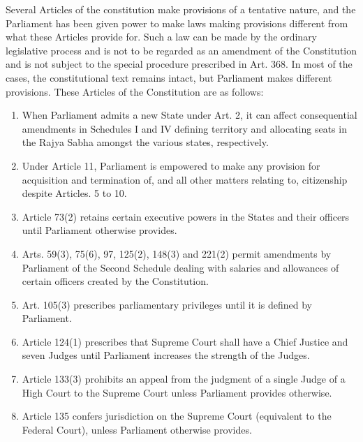 \begin{multicols}{2}
\noi
Several Articles of the constitution make provisions of a tentative nature, and the Parliament has
been given power to make laws making provisions different from what these Articles provide for.
Such a law can be made by the ordinary legislative process and is not to be regarded as an
amendment of the Constitution and is not subject to the special procedure prescribed in Art. 368.
In most of the cases, the constitutional text remains intact, but Parliament makes different
provisions. These Articles of the Constitution are as follows:

\begin{enumerate}

\item[(1)] When Parliament admits a new State under Art. 2, it can affect consequential amendments in
Schedules I and IV defining territory and allocating seats in the Rajya Sabha amongst the various
states, respectively.

\item[(2)] Under Article 11, Parliament is empowered to make any provision for acquisition and termination of, and all other matters relating to, citizenship despite Articles. 5 to 10.

\item[(3)] Article 73(2) retains certain executive powers in the States and their officers until Parliament
otherwise provides.

\item[(4)] Arts. 59(3), 75(6), 97, 125(2), 148(3) and 221(2) permit amendments by Parliament of the
Second Schedule dealing with salaries and allowances of certain officers created by the
Constitution.

\item[(5)] Art. 105(3) prescribes parliamentary privileges until it is defined by Parliament.

\item[(6)] Article 124(1) prescribes that Supreme Court shall have a Chief Justice and seven Judges until
Parliament increases the strength of the Judges.

\item[(7)] Article 133(3) prohibits an appeal from the judgment of a single Judge of a High Court to the
Supreme Court unless Parliament provides otherwise.

\item[(8)] Article 135 confers jurisdiction on the Supreme Court (equivalent to the Federal Court), unless
Parliament otherwise provides.


\end{enumerate}
\end{multicols}
